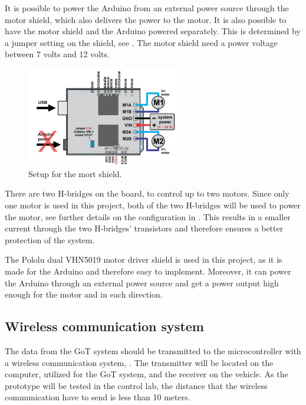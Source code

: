 It is possible to power the Arduino from an external power source through the motor shield, which also delivers the power to the motor. It is also possible to have the motor shield and the Arduino powered separately. This is determined by a jumper setting on the shield, see . The motor shield need a power voltage between 7 volts and 12 volts.\cite{PCorporation}

\begin{figure}[H]
	\centering
	\includegraphics[width=0.60\textwidth]{figures/MotordriverIO.png}
		\caption{Setup for the mort shield.}
	\label{MotorDriveIO}
\end{figure}

There are two H-bridges on the board, to control up to two motors. Since only one motor is used in this project, both of the two H-bridges will be used to power the motor, see further details on the configuration in . This results in a smaller current through the two H-bridges' transistors and therefore ensures a better protection of the system.\cite{PCorporation}

%
The Pololu dual VHN5019 motor driver shield is used in this project, as it is made for the Arduino and therefore easy to implement. Moreover, it can power the Arduino through an external power source and get a power output high enough for the motor and in each direction.\cite{STMicroelectronics}

\subsection{Wireless communication system}
The data from the GoT system should be transmitted to the microcontroller with a wireless communication system, . The transmitter will be located on the computer, utilized for the GoT system, and the receiver on the vehicle. As the prototype will be tested in the control lab, the distance that the wireless communication have to send is less than 10 meters.

